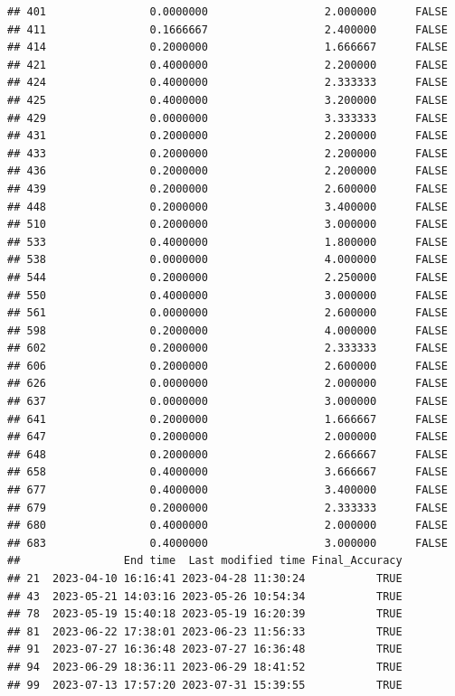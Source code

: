 \documentclass[
]{article}
\begin{document}
\begin{verbatim}
## 401                0.0000000                  2.000000      FALSE
## 411                0.1666667                  2.400000      FALSE
## 414                0.2000000                  1.666667      FALSE
## 421                0.4000000                  2.200000      FALSE
## 424                0.4000000                  2.333333      FALSE
## 425                0.4000000                  3.200000      FALSE
## 429                0.0000000                  3.333333      FALSE
## 431                0.2000000                  2.200000      FALSE
## 433                0.2000000                  2.200000      FALSE
## 436                0.2000000                  2.200000      FALSE
## 439                0.2000000                  2.600000      FALSE
## 448                0.2000000                  3.400000      FALSE
## 510                0.2000000                  3.000000      FALSE
## 533                0.4000000                  1.800000      FALSE
## 538                0.0000000                  4.000000      FALSE
## 544                0.2000000                  2.250000      FALSE
## 550                0.4000000                  3.000000      FALSE
## 561                0.0000000                  2.600000      FALSE
## 598                0.2000000                  4.000000      FALSE
## 602                0.2000000                  2.333333      FALSE
## 606                0.2000000                  2.600000      FALSE
## 626                0.0000000                  2.000000      FALSE
## 637                0.0000000                  3.000000      FALSE
## 641                0.2000000                  1.666667      FALSE
## 647                0.2000000                  2.000000      FALSE
## 648                0.2000000                  2.666667      FALSE
## 658                0.4000000                  3.666667      FALSE
## 677                0.4000000                  3.400000      FALSE
## 679                0.2000000                  2.333333      FALSE
## 680                0.4000000                  2.000000      FALSE
## 683                0.4000000                  3.000000      FALSE
##                End time  Last modified time Final_Accuracy
## 21  2023-04-10 16:16:41 2023-04-28 11:30:24           TRUE
## 43  2023-05-21 14:03:16 2023-05-26 10:54:34           TRUE
## 78  2023-05-19 15:40:18 2023-05-19 16:20:39           TRUE
## 81  2023-06-22 17:38:01 2023-06-23 11:56:33           TRUE
## 91  2023-07-27 16:36:48 2023-07-27 16:36:48           TRUE
## 94  2023-06-29 18:36:11 2023-06-29 18:41:52           TRUE
## 99  2023-07-13 17:57:20 2023-07-31 15:39:55           TRUE

\end{verbatim}
\end{document}
